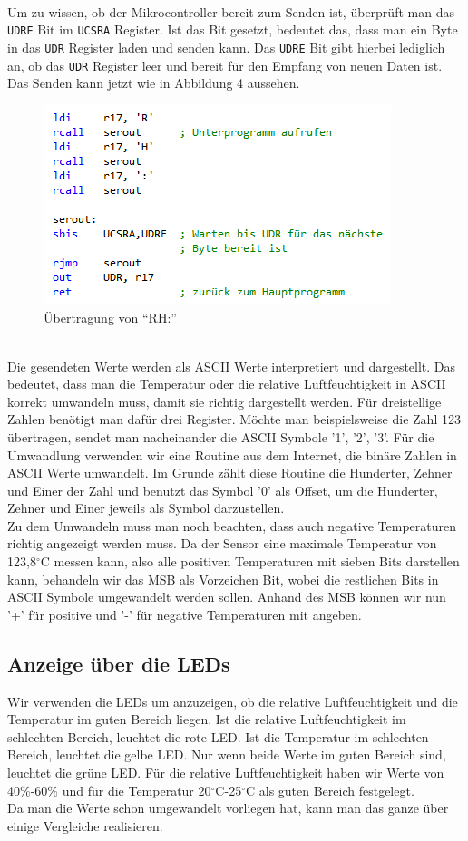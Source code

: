\documentclass[]{article}
\begin{document}
\\Um zu wissen, ob der Mikrocontroller bereit zum Senden ist, überprüft man das \texttt{UDRE} Bit im \texttt{UCSRA} Register. Ist das Bit gesetzt, bedeutet das, dass man ein Byte in das \texttt{UDR} Register laden und senden kann. Das \texttt{UDRE} Bit gibt hierbei lediglich an, ob das \texttt{UDR} Register leer und bereit für den Empfang von neuen Daten ist. Das Senden kann jetzt wie in Abbildung 4 aussehen.
\begin{figure}[h]
	\centering
	\includegraphics[width=0.7\columnwidth]{UART.png}
	\caption{Übertragung von "`RH:"'}
\end{figure}
\\Die gesendeten Werte werden als ASCII Werte interpretiert und dargestellt. Das bedeutet, dass man die Temperatur oder die relative Luftfeuchtigkeit in ASCII korrekt umwandeln muss, damit sie richtig dargestellt werden. Für dreistellige Zahlen benötigt man dafür drei Register. Möchte man beispielsweise die Zahl 123 übertragen, sendet man nacheinander die ASCII Symbole '1', '2', '3'. Für die Umwandlung verwenden wir eine Routine aus dem Internet, die binäre Zahlen in ASCII Werte umwandelt. Im Grunde zählt diese Routine die Hunderter, Zehner und Einer der Zahl und benutzt das Symbol '0' als Offset, um die Hunderter, Zehner und Einer jeweils als Symbol darzustellen.
\\Zu dem Umwandeln muss man noch beachten, dass auch negative Temperaturen richtig angezeigt werden muss. Da der Sensor eine maximale Temperatur von 123,8$^\circ$C messen kann, also alle positiven Temperaturen mit sieben Bits darstellen kann, behandeln wir das MSB als Vorzeichen Bit, wobei die restlichen Bits in ASCII Symbole umgewandelt werden sollen. Anhand des MSB können wir nun '+' für positive und '-' für negative Temperaturen mit angeben.

\subsection{Anzeige über die LEDs}
Wir verwenden die LEDs um anzuzeigen, ob die relative Luftfeuchtigkeit und die Temperatur im guten Bereich liegen. Ist die relative Luftfeuchtigkeit im schlechten Bereich, leuchtet die rote LED. Ist die Temperatur im schlechten Bereich, leuchtet die gelbe LED. Nur wenn beide Werte im guten Bereich sind, leuchtet die grüne LED. Für die relative Luftfeuchtigkeit haben wir Werte von 40\%-60\% und für die Temperatur 20$^\circ$C-25$^\circ$C als guten Bereich festgelegt.
\\Da man die Werte schon umgewandelt vorliegen hat, kann man das ganze über einige Vergleiche realisieren.
\end{document}
